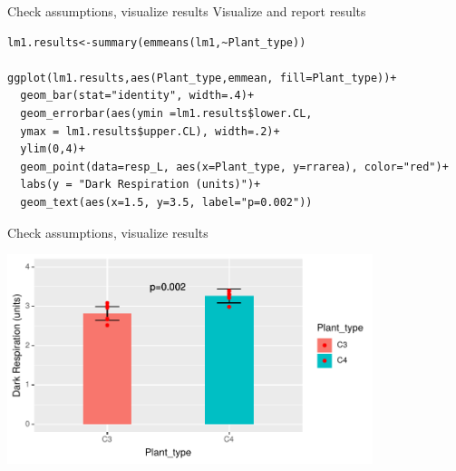 \documentclass{beamer}
\makeatletter
\newenvironment{kframe}{%
 \def\at@end@of@kframe{}%
 \ifinner\ifhmode%
  \def\at@end@of@kframe{\end{minipage}}%
  \begin{minipage}{\columnwidth}%
 \fi\fi%
 \def\FrameCommand##1{\hskip\@totalleftmargin \hskip-\fboxsep
 \colorbox{shadecolor}{##1}\hskip-\fboxsep
     \hskip-\linewidth \hskip-\@totalleftmargin \hskip\columnwidth}%
 \MakeFramed {\advance\hsize-\width
   \@totalleftmargin\z@ \linewidth\hsize
   \@setminipage}}%
 {\par\unskip\endMakeFramed%
 \at@end@of@kframe}
\newenvironment{knitrout}{}{} %
\makeatother
\begin{document}
\begin{frame}[fragile]{Check assumptions, visualize results}
Visualize and report results
\begin{knitrout}
\color{fgcolor}\begin{kframe}
\footnotesize
\begin{verbatim}
lm1.results<-summary(emmeans(lm1,~Plant_type))

ggplot(lm1.results,aes(Plant_type,emmean, fill=Plant_type))+
  geom_bar(stat="identity", width=.4)+
  geom_errorbar(aes(ymin =lm1.results$lower.CL, 
  ymax = lm1.results$upper.CL), width=.2)+
  ylim(0,4)+
  geom_point(data=resp_L, aes(x=Plant_type, y=rrarea), color="red")+
  labs(y = "Dark Respiration (units)")+
  geom_text(aes(x=1.5, y=3.5, label="p=0.002"))  
\end{verbatim}
\end{kframe}
\end{knitrout}
\end{frame}


\begin{frame}{Check assumptions, visualize results}

\includegraphics[width=0.8\textwidth]{Figures/C3C4output}
\end{frame}
\end{document}
